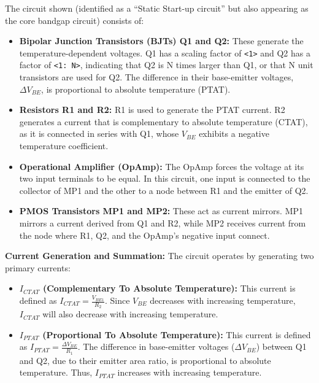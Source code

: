 \documentclass[
  a4paper,
]{article}
\providecommand{\tightlist}{%
  \setlength{\itemsep}{0pt}\setlength{\parskip}{0pt}}
\begin{document}
\begin{enumerate}
  The circuit shown (identified as a ``Static Start-up circuit'' but
  also appearing as the core bandgap circuit) consists of:

  \begin{itemize}
  \tightlist
  \item
    \textbf{Bipolar Junction Transistors (BJTs) Q1 and Q2:} These
    generate the temperature-dependent voltages. Q1 has a scaling factor
    of \texttt{\textless{}1\textgreater{}} and Q2 has a factor of
    \texttt{\textless{}1:\ N\textgreater{}}, indicating that Q2 is N
    times larger than Q1, or that N unit transistors are used for Q2.
    The difference in their base-emitter voltages, \(\Delta V_{BE}\), is
    proportional to absolute temperature (PTAT).
  \item
    \textbf{Resistors R1 and R2:} R1 is used to generate the PTAT
    current. R2 generates a current that is complementary to absolute
    temperature (CTAT), as it is connected in series with Q1, whose
    \(V_{BE}\) exhibits a negative temperature coefficient.
  \item
    \textbf{Operational Amplifier (OpAmp):} The OpAmp forces the voltage
    at its two input terminals to be equal. In this circuit, one input
    is connected to the collector of MP1 and the other to a node between
    R1 and the emitter of Q2.
  \item
    \textbf{PMOS Transistors MP1 and MP2:} These act as current mirrors.
    MP1 mirrors a current derived from Q1 and R2, while MP2 receives
    current from the node where R1, Q2, and the OpAmp's negative input
    connect.
  \end{itemize}

  \textbf{Current Generation and Summation:} The circuit operates by
  generating two primary currents:

  \begin{itemize}
  \tightlist
  \item
    \textbf{\(I_{CTAT}\) (Complementary To Absolute Temperature):} This
    current is defined as \(I_{CTAT} = \frac{V_{BE1}}{R_2}\). Since
    \(V_{BE}\) decreases with increasing temperature, \(I_{CTAT}\) will
    also decrease with increasing temperature.
  \item
    \textbf{\(I_{PTAT}\) (Proportional To Absolute Temperature):} This
    current is defined as \(I_{PTAT} = \frac{\Delta V_{BE}}{R_1}\). The
    difference in base-emitter voltages (\(\Delta V_{BE}\)) between Q1
    and Q2, due to their emitter area ratio, is proportional to absolute
    temperature. Thus, \(I_{PTAT}\) increases with increasing
    temperature.
  \end{itemize}


\end{enumerate}
\end{document}
